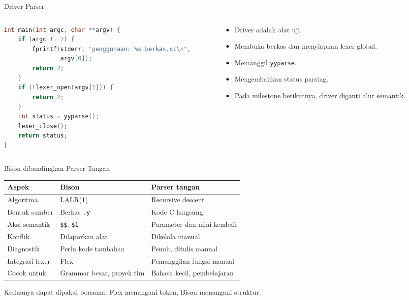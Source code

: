 \documentclass[aspectratio=169,10pt,t]{beamer}
\begin{document}
\begin{frame}[fragile]{Driver Parser}
  \begin{columns}[T,onlytextwidth]
    \begin{column}{0.56\textwidth}
      \begin{lstlisting}[language=C,numbers=none,
        caption={Driver yang memanggil \texttt{yyparse}}]
int main(int argc, char **argv) {
    if (argc != 2) {
        fprintf(stderr, "penggunaan: %s berkas.sc\n",
                argv[0]);
        return 2;
    }
    if (!lexer_open(argv[1])) {
        return 2;
    }
    int status = yyparse();
    lexer_close();
    return status;
}
      \end{lstlisting}
    \end{column}
    \begin{column}{0.40\textwidth}
      \begin{itemize}
        \item Driver adalah alat uji.
        \item Membuka berkas dan menyiapkan lexer global.
        \item Memanggil \texttt{yyparse}.
        \item Mengembalikan status parsing.
        \item Pada milestone berikutnya, driver diganti alur
              semantik.
      \end{itemize}
    \end{column}
  \end{columns}
\end{frame}

\begin{frame}{Bison dibandingkan Parser Tangan}
  \scriptsize
  \setlength{\tabcolsep}{4pt}
  \begin{tabular}{@{}p{3.0cm}p{5.6cm}p{5.4cm}@{}}
    \toprule
    \textbf{Aspek} & \textbf{Bison} & \textbf{Parser tangan} \\
    \midrule
    Algoritma & LALR(1) & Recursive descent \\
    Bentuk sumber & Berkas \texttt{.y} & Kode C langsung \\
    Aksi semantik & \texttt{\$\$}, \texttt{\$1} &
      Parameter dan nilai kembali \\
    Konflik & Dilaporkan alat & Dikelola manual \\
    Diagnostik & Perlu kode tambahan & Penuh, ditulis manual \\
    Integrasi lexer & Flex & Pemanggilan fungsi manual \\
    Cocok untuk & Grammar besar, proyek tim &
      Bahasa kecil, pembelajaran \\
    \bottomrule
  \end{tabular}

  \vspace{4pt}
  {\scriptsize\color{ubbblue!75}Keduanya dapat dipakai bersama: Flex
  menangani token, Bison menangani struktur.}
\end{frame}
\end{document}

